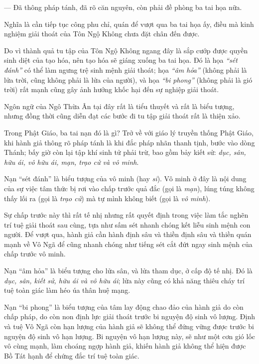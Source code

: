 — Đã thông pháp tánh, đã rõ căn nguyên, còn phải đề phòng ba tai họa nữa.

Nghĩa là cần tiếp tục công phu chỉ, quán để vượt qua ba tai họa ấy, điều mà kinh nghiệm giải thoát của Tôn Ngộ Không chưa đặt chân đến được.

Do vì thành quả tu tập của Tôn Ngộ Không ngang đây là sắp cướp được quyền sinh diệt của tạo hóa, nên tạo hóa sẽ giáng xuống ba tai họa. Đó là họa \emph{``sét đánh''} có thể làm ngưng trệ sinh mệnh giải thoát; họa \emph{``âm hỏa''} (không phải là lửa trời, cũng không phải là lửa của người), và họa \emph{``bi phong''} (không phải là gió trời) rất mạnh cũng gây ảnh hưởng khốc hại đến sự nghiệp giải thoát.

Ngôn ngữ của Ngô Thừa Ân tại đây rất là tiểu thuyết và rất là biểu tượng, nhưng đồng thời cũng diễn đạt các bước đi tu tập giải thoát rất là thiện xảo.

Trong Phật Giáo, ba tai nạn đó là gì? Trở về với giáo lý truyền thống Phật Giáo, khi hành giả thông rõ pháp tánh là khi đắc pháp nhãn thanh tịnh, bước vào dòng Thánh; bấy giờ còn lại tập khí sinh tử phải trừ, bao gồm bảy kiết sử: \emph{dục, sân, hữu ái, vô hữu ái, mạn, trạo cử và vô minh}.

Nạn ``sét đánh'' là biểu tượng của vô minh (hay \emph{si}). Vô minh ở đây là nội dung của sự việc tâm thức bị rơi vào chấp trước quả đắc (gọi là \emph{mạn}), lúng túng không thấy lối ra (gọi là \emph{trạo cử}) mà tự mình không biết (gọi là \emph{vô minh}).

Sự chấp trước này thì rất tế nhị nhưng rất quyết định trong việc làm tắc nghẽn trí tuệ giải thoát sau cùng, tựa như sấm sét nhanh chóng kết liễu sinh mệnh con người. Để vượt qua, hành giả cần hành định sâu và thiền định sâu và thiền quán mạnh về Vô Ngã để cũng nhanh chóng như tiếng sét cắt đứt ngay sinh mệnh của chấp trước vô minh.

Nạn ``âm hỏa'' là biểu tượng cho lửa sân, và lửa tham dục, ở cấp độ tế nhị. Đó là \emph{dục, sân, kiết sử, hữu ái và vô hữu ái}; lửa này cũng có khả năng thiêu cháy trí tuệ toàn giác làm héo úa thân huệ mạng.

Nạn ``bi phong'' là biểu tượng của tâm lay động chao đảo của hành giả do còn chấp pháp, do còn non định lực giải thoát trước bi nguyện độ sinh vô lượng. Định và tuệ Vô Ngã còn hạn lượng của hành giả sẽ không thể đứng vững được trước bi nguyện độ sinh vô hạn lượng. Bi nguyện vô hạn lượng này, sẽ như một cơn gió lốc vô cùng mạnh, làm choáng ngợp hành giả, khiến hành giả không thể hiện được Bồ Tát hạnh để chứng đắc trí tuệ toàn giác.

